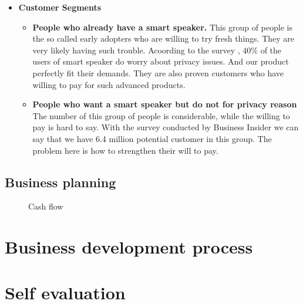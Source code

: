 \documentclass[12pt,twoside]{article}
\begin{document}
\begin{itemize}
\item \textbf{Customer Segments}\\
\begin{itemize}
    \item \textbf{People who already have a smart speaker.} This group of people is the so called early adopters who are willing to try fresh things. They are very 
    likely having such trouble. Acoording to the survey \cite{amountsmartassistant}, 40\% of the users of smart speaker do worry about privacy issues. And our product 
    perfectly fit their demands. They are also proven customers who have willing to pay for such advanced products.
    \item \textbf{People who want a smart speaker but do not for privacy reason} The number of this group of people is considerable, while the willing to pay is hard to say.
    With the survey \cite{privacyfear} conducted by Business Insider we can say that we have 6.4 million potential customer in this group. The problem here is how to
    strengthen their will to pay.
\end{itemize}



\end{itemize}
\subsection{Business planning}

\begin{figure}[!h]
    \centering
    \caption{Cash flow}
    \label{fig:Cash flow}
\end{figure}

\section{Business development process}
\label{sec:Business development process}

\section{Self evaluation}



\end{document}
